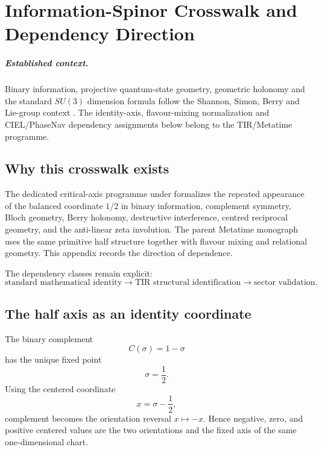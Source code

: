 \chapter{Information-Spinor Crosswalk and Dependency Direction}
\label{app:information_spinor_crosswalk}

\paragraph{Established context.}
Binary information, projective quantum-state geometry, geometric holonomy and the
standard $SU(3)$ dimension formula follow the Shannon, Simon, Berry and
Lie-group context
\cite{shannon1948,Simon1983,berry1984,BottTu1982}.
The identity-axis, flavour-mixing normalization and CIEL/PhaseNav dependency
assignments below belong to the TIR/Metatime programme.


\section{Why this crosswalk exists}
The dedicated critical-axis programme under
formalizes the repeated appearance of the balanced coordinate $1/2$ in binary information, complement symmetry, Bloch geometry, Berry holonomy, destructive interference, centred reciprocal geometry, and the anti-linear zeta involution. The parent Metatime monograph uses the same primitive half structure together with flavour mixing and relational geometry. This appendix records the direction of dependence.

The dependency classes remain explicit:
\[
\boxed{
\text{standard mathematical identity}
\longrightarrow
\text{TIR structural identification}
\longrightarrow
\text{sector validation}.
}
\]

\section{The half axis as an identity coordinate}
The binary complement
\[
C(\sigma)=1-\sigma
\]
has the unique fixed point
\[
\sigma=\frac12.
\]
Using the centered coordinate
\[
x=\sigma-\frac12,
\]
complement becomes the orientation reversal $x\mapsto-x$. Hence negative, zero, and positive centered values are the two orientations and the fixed axis of the same one-dimensional chart.

